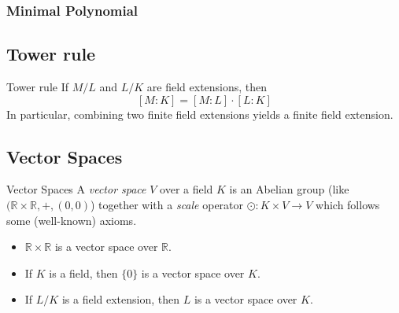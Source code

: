 \documentclass[%
	sans,
	12pt,
]{beamer}
\newcommand{\RR}{\mathbb{R}}
\begin{document}
\subsubsection{Minimal Polynomial}

\subsection{Tower rule}
\begin{frame}{Tower rule}
If $M/L$ and $L/K$ are field extensions, then
\[[M : K] = [M : L] \cdot [L : K]\]\pause %
In particular, combining two finite field extensions yields a finite field extension. %
\end{frame}

\subsection{Vector Spaces}
\begin{frame}{Vector Spaces}\pause
A \emph{vector space} $V$ over a field $K$ is an Abelian group (like $(\RR\times\RR,+,(0,0)$) together with a \emph{scale} operator $\odot:K\times V \to V$ which follows some (well-known) axioms.\pause
\begin{itemize}
\item $\RR \times \RR$ is a vector space over $\RR$.\pause
\item If $K$ is a field, then $\{0\}$ is a vector space over $K$.\pause
\item If $L/K$ is a field extension, then $L$ is a vector space over $K$.
\end{itemize}
\end{frame}
\end{document}
